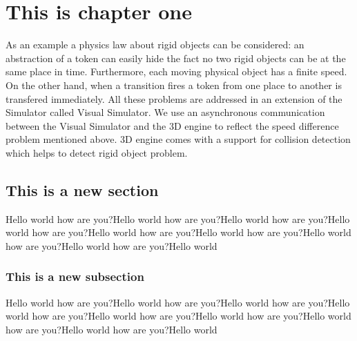 \chapter{This is chapter one}

As an example a physics law about rigid objects can be considered: an abstraction of a token can easily hide the fact no two rigid objects can be at the same place in time. Furthermore, each moving physical object has a finite speed. On the other hand, when a transition fires a token from one place to another is transfered immediately. All these problems are addressed in an extension of the Simulator called Visual Simulator.  We use an asynchronous communication between the Visual Simulator and the 3D engine to reflect the speed difference problem mentioned above. 3D engine comes with a support for collision detection which helps to detect rigid object problem.

\section{This is a new section}
Hello world how are you?Hello world how are you?Hello world how are you?Hello world how are you?Hello world how are you?Hello world how are you?Hello world how are you?Hello world how are you?Hello world \subsection{This is a new subsection}
Hello world how are you?Hello world how are you?Hello world how are you?Hello world how are you?Hello world how are you?Hello world how are you?Hello world how are you?Hello world how are you?Hello world 